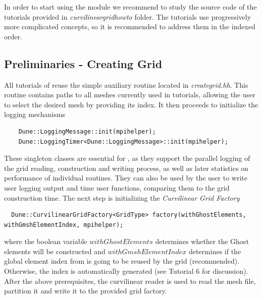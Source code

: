 \noindent
In order to start using the \curvgrid{} module we recommend to study the source code of the tutorials provided in \textit{curvilineargridhowto} folder. The tutorials use progressively more complicated concepts, so it is recommended to address them in the indexed order.


\subsection{Preliminaries - Creating Grid}
\label{usage-howto-tutorial-preliminaries}

All tutorials of \curvgrid{} reuse the simple auxiliary routine located in \textit{creategrid.hh}. This routine contains paths to all meshes currently used in tutorials, allowing the user to select the desired mesh by providing its index. It then proceeds to initialize the logging mechanisms
\begin{mybox}
\begin{lstlisting}
    Dune::LoggingMessage::init(mpihelper);
    Dune::LoggingTimer<Dune::LoggingMessage>::init(mpihelper);
\end{lstlisting}
\end{mybox}

\noindent
These singleton classes are essential for \curvgrid{}, as they support the parallel logging of the grid reading, construction and writing process, as well as later statistics on performance of individual routines. They can also be used by the user to write user logging output and time user functions, comparing them to the grid construction time. The next step is initializing the \textit{Curvilinear Grid Factory}

\begin{mybox}
\begin{lstlisting}
  Dune::CurvilinearGridFactory<GridType> factory(withGhostElements, withGmshElementIndex, mpihelper);
\end{lstlisting}
\end{mybox}

\noindent
where the boolean variable $withGhostElements$ determines whether the Ghost elements will be constructed and $withGmshElementIndex$ determines if the global element index from \gmsh{} is going to be reused by the grid (recommended). Otherwise, the index is automatically generated (see Tutorial 6 for discussion). After the above prerequisites, the curvilinear \gmsh{} reader is used to read the mesh file, partition it and write it to the provided grid factory.

